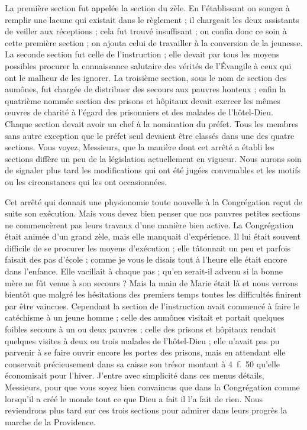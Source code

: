 La première section fut appelée la section du zèle. En l'établissant on songea à remplir une lacune qui existait dans le règlement ; il chargeait les deux assistants de veiller aux réceptions ; cela fut trouvé insuffisant ; on confia donc ce soin à cette première section ; on ajouta celui de travailler à la conversion de la jeunesse. La seconde section fut celle de l'instruction ; elle devait par tous les moyens possibles procurer la connaissance salutaire des vérités de l'Évangile à ceux qui ont le malheur de les ignorer. La troisième section, sous le nom de section des aumônes, fut chargée de distribuer des secours aux pauvres honteux ; enfin la quatrième nommée section des prisons et hôpitaux devait exercer les mêmes œuvres de charité à l'égard des prisonniers et des malades de l'hôtel-Dieu. Chaque section devait avoir un chef à la nomination du préfet. Tous les membres sans autre exception que le préfet seul devaient être classés dans une des quatre sections. Vous voyez, Messieurs, que la manière dont cet arrêté a établi les sections diffère un peu de la législation actuellement en vigueur. Nous aurons soin de signaler plus tard les modifications qui ont été jugées convenables et les motifs ou les circonstances qui les ont occasionnées.

Cet arrêté qui donnait une physionomie toute nouvelle à la Congrégation reçut de suite son exécution. Mais vous devez bien penser que nos pauvres petites sections ne commencèrent pas leurs travaux d'une manière bien active. La Congrégation
était animée d'un grand zèle, mais elle manquait d'expérience. Il lui était souvent difficile de se procurer les moyens d'exécution ; elle tâtonnait un peu et parfois faisait des pas d'école ; comme je vous le disais tout à l'heure elle était encore dans l'enfance. Elle vacillait à chaque pas ; qu'en serait-il advenu si la bonne mère ne fût venue à son secours ? Mais la main de Marie était là et nous verrons bientôt que malgré les hésitations des premiers temps toutes les difficultés finirent par être vaincues. Cependant la section de l'instruction avait commencé à faire le catéchisme à un jeune homme ; celle des aumônes visitait et portait quelques foibles secours à un ou deux pauvres ; celle des prisons et hôpitaux rendait quelques visites à deux ou trois malades de l'hôtel-Dieu ; elle n'avait pas pu parvenir à se faire ouvrir encore les portes des prisons, mais en attendant elle conservait précieusement dans sa caisse son trésor montant à 4~f.~50 qu'elle économisait pour l'hiver. J'entre avec simplicité dans ces menus détails, Messieurs, pour que vous soyez bien convaincus que dans la Congrégation comme lorsqu'il a créé le monde tout ce que Dieu a fait il l'a fait de rien. Nous reviendrons plus tard sur ces trois sections pour admirer dans leurs progrès la marche de la Providence.

